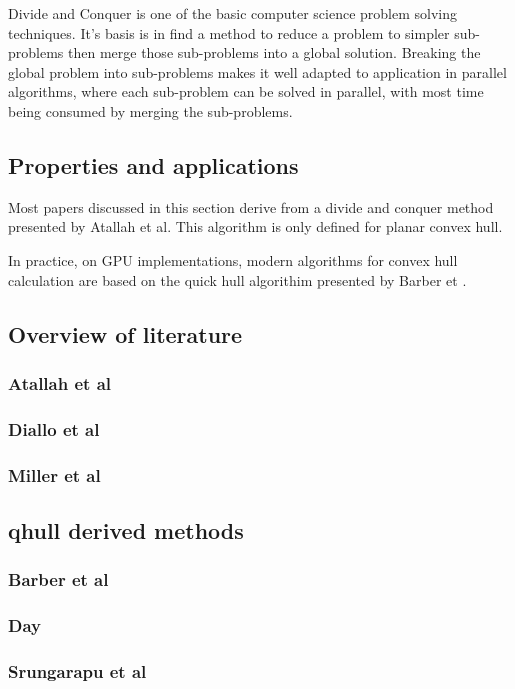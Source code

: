 \documentclass[10pt,a4paper,draft]{report}
\begin{document}
Divide and Conquer is one of the basic computer science problem solving techniques. It's basis is in find a method to reduce a problem to simpler sub-problems then merge those sub-problems into a global solution. Breaking the global problem into sub-problems makes it well adapted to application in parallel algorithms, where each sub-problem can be solved in parallel, with most time being consumed by merging the sub-problems.


\subsection{Properties and applications}

Most papers discussed in this section derive from a divide and conquer method presented by Atallah et al.
This algorithm is only defined for planar convex hull.

In practice, on GPU implementations, modern algorithms for convex hull calculation are based on the quick hull algorithim presented by Barber et .
\subsection{Overview of literature}
\subsubsection{Atallah et al}
\subsubsection{Diallo et al}
\subsubsection{Miller et al}

\subsection{qhull derived methods}
\subsubsection{Barber et al}
\subsubsection{Day}
\subsubsection{Srungarapu et al}
\end{document}
